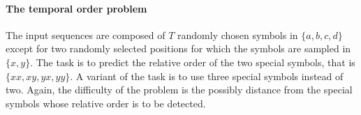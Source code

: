 \paragraph{The temporal order problem}
The input sequences are composed of $T$ randomly chosen symbols in $\{a,b,c,d\}$ except for two randomly selected positions for which the symbols are sampled in $\{x,y\}$.
The task is to predict the relative order of the two special symbols, that is $\{xx,xy,yx,yy\}$. A variant of the task is to use three special symbols instead of two.
Again, the difficulty of the problem is the possibly distance from the special symbols whose relative order is to be detected. 
